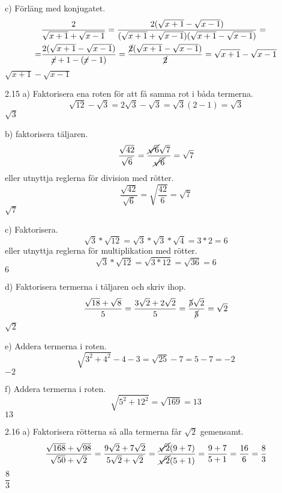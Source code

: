 \begin{task}{c)}
	Förläng med konjugatet.
	\begin{align*}
	&\dfrac{2}{\sqrt{x+1}+\sqrt{x-1}}=
	\dfrac{2(\sqrt{x+1}-\sqrt{x-1})}{(\sqrt{x+1}+\sqrt{x-1})(\sqrt{x+1}-\sqrt{x-1})}= \\ =
	&\dfrac{2(\sqrt{x+1}-\sqrt{x-1})}{\cancel{x}+1-(\cancel{x}-1)}=
	\dfrac{\cancel{2}(\sqrt{x+1}-\sqrt{x-1})}{\cancel{2}}=
	\sqrt{x+1}-\sqrt{x-1}
	\end{align*}
	\ans $\sqrt{x+1}-\sqrt{x-1}$
\end{task}

\begin{task}{2.15 a)}
	Faktorisera ena roten för att få samma rot i båda termerna.
	\[\sqrt{12}-\sqrt{3}=
	2\sqrt{3}-\sqrt{3}=
	\sqrt{3}(2-1)=
	\sqrt{3}\]
	\ans $\sqrt{3}$
\end{task}

\begin{task}{b)}
	faktorisera täljaren.
	\[\dfrac{\sqrt{42}}{\sqrt{6}}=
	\dfrac{\cancel{\sqrt{6}}\sqrt{7}}{\cancel{\sqrt{6}}}=
	\sqrt{7}\]
	eller utnyttja reglerna för division med rötter.
	\[\dfrac{\sqrt{42}}{\sqrt{6}}=\sqrt{\dfrac{42}{6}}=\sqrt{7}\]
	\ans $\sqrt{7}$
\end{task}

\begin{task}{c)}
	Faktorisera.
	\[\sqrt{3}*\sqrt{12}=
	\sqrt{3}*\sqrt{3}*\sqrt{4}=
	3*2=6\]
	eller utnyttja reglerna för multiplikation med rötter.
	\[\sqrt{3}*\sqrt{12}=
	\sqrt{3*12}=
	\sqrt{36}=
	6\]
	\ans $6$
\end{task}

\begin{task}{d)}
	Faktorisera termerna i täljaren och skriv ihop.
	\[\dfrac{\sqrt{18}+\sqrt{8}}{5}=
	\dfrac{3\sqrt{2}+2\sqrt{2}}{5}=
	\dfrac{\cancel{5}\sqrt{2}}{\cancel{5}}=
	\sqrt{2}\]
	\ans $\sqrt{2}$
\end{task}

\begin{task}{e)}
	Addera termerna i roten.
	\[\sqrt{3^2+4^2}-4-3=
	\sqrt{25}-7=
	5-7=
	-2\]
	\ans $-2$
\end{task}

\begin{task}{f)}
	Addera termerna i roten.
	\[\sqrt{5^2+12^2}=\sqrt{169}=13\]
	\ans $13$
\end{task}

\begin{task}{2.16 a)}
	Faktorisera rötterna så alla termerna får $\sqrt{2}$ gemensamt.
	\[\dfrac{\sqrt{168}+\sqrt{98}}{\sqrt{50}+\sqrt{2}}=
	\dfrac{9\sqrt{2}+7\sqrt{2}}{5\sqrt{2}+\sqrt{2}}=
	\dfrac{\cancel{\sqrt{2}}(9+7)}{\cancel{\sqrt{2}}(5+1)}=
	\dfrac{9+7}{5+1}=
	\dfrac{16}{6}=
	\dfrac{8}{3}\]
	\ans $\dfrac{8}{3}$
\end{task}

